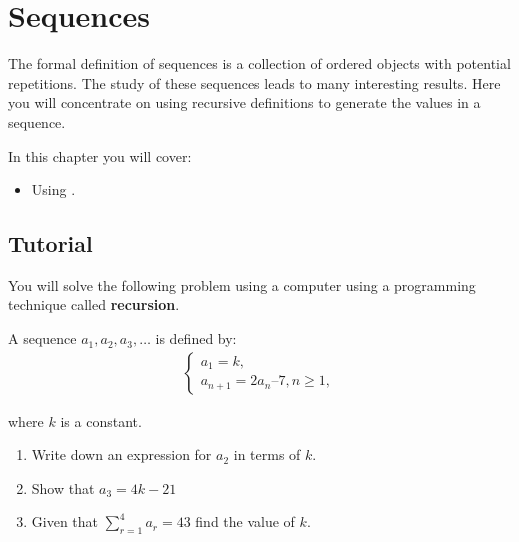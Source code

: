 \chapter{Sequences}
\label{chp:sequences}

The formal definition of sequences is a collection of ordered objects with
potential repetitions.
The study of these sequences leads to many interesting results. Here you will
concentrate on using recursive definitions to generate the values in a sequence.

\begin{note}
In this chapter you will cover:
\begin{itemize}
\item 

Using .

\end{itemize}
\end{note}




\section{Tutorial}
\label{\detokenize{tools-for-mathematics/07-sequences/tutorial/main:tutorial}}\label{\detokenize{tools-for-mathematics/07-sequences/tutorial/main::doc}}

You will solve the following problem using a computer using a programming
technique called \textbf{recursion}.


A sequence \(a_1, a_2, a_3, …\) is defined by:
\begin{equation*}
\begin{split}
    \left\{
    \begin{array}{l}
        a_1 = k,\\
        a_{n + 1} = 2a_n – 7, n \geq 1,
    \end{array}
    \right.
\end{split}
\end{equation*}

where \(k\) is a constant.
\begin{enumerate}

\item 

Write down an expression for \(a_2\) in terms of \(k\).

\item 

Show that \(a_3 = 4k -21\)

\item 

Given that \(\sum_{r=1}^4 a_r = 43\) find the value of \(k\).

\end{enumerate}



